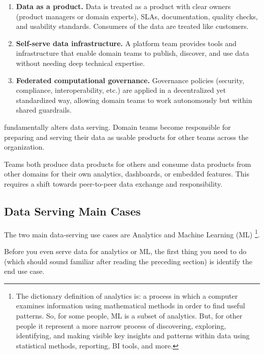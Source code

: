 \begin{itemize}
{\begin{enumerate}
            \item \textbf{Data as a product.} Data is treated
            as a product with clear owners (product managers or
            domain experts), SLAs, documentation, quality checks,
            and usability standards. Consumers of the data are
            treated like customers.

            \item \textbf{Self-serve data infrastructure.}
            A platform team provides tools and infrastructure
            that enable domain teams to publish, discover, and
            use data without needing deep technical expertise.
            
            \item \textbf{Federated computational governance.}
            Governance policies (security, compliance,
            interoperability, etc.) are applied in a decentralized
            yet standardized way, allowing domain teams to work
            autonomously but within shared guardrails.
        \end{enumerate}
    }
    fundamentally alters data serving. Domain teams
    become responsible for preparing and serving their data as
    usable products for other teams across the organization.

    Teams both produce data products for others and consume data
    products from other domains for their own analytics,
    dashboards, or embedded features. This requires a shift
    towards peer-to-peer data exchange and responsibility.
\end{itemize}



\subsection{Data Serving Main Cases}
The two main data-serving use cases are Analytics and Machine
Learning (ML)
\footnote{
    The dictionary definition of analytics is:
    a process in which a computer examines information using
    mathematical methods in order to find useful patterns.
    So, for some people, ML is a subset of analytics. But,
    for other people it represent a more narrow process of
    discovering, exploring, identifying, and making visible key
    insights and patterns within data using statistical
    methods, reporting, BI tools, and more.

    
}.

Before you even serve data for analytics or ML, the first thing
you need to do (which should sound familiar after reading the
preceding section) is identify the end use case.




